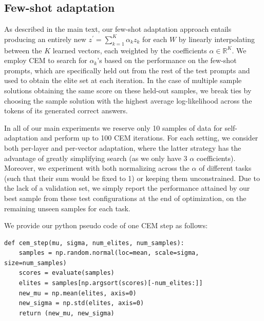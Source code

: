 

\subsection{Few-shot adaptation}
\label{app:sec:fewshot}

As described in the main text, our few-shot adaptation approach entails producing an entirely new $z^\prime=\sum^{K}_{k=1} \alpha_k z_k$ for each $W$ by linearly interpolating between the $K$ learned \svdacro vectors, each weighted by the coefficients $\alpha \in \mathbb{R}^K$.
We employ CEM to search for $\alpha_k$'s based on the performance on the few-shot prompts, which are specifically held out from the rest of the test prompts and used to obtain the elite set at each iteration. 
In the case of multiple sample solutions obtaining the same score on these held-out samples, we break ties by choosing the sample solution with the highest average log-likelihood across the tokens of its generated correct answers.

In all of our main experiments we reserve only 10 samples of data for self-adaptation and perform up to 100 CEM iterations. For each setting, we consider both per-layer and per-vector adaptation, where the latter strategy has the advantage of greatly simplifying search (as we only have 3 $\alpha$ coefficients). Moreover, we experiment with both normalizing across the $\alpha$ of different tasks (such that their sum would be fixed to 1) or keeping them unconstrained. Due to the lack of a validation set, we simply report the performance attained by our best sample from these test configurations at the end of optimization, on the remaining unseen samples for each task.

We provide our python pseudo code of one CEM step as follows:
\begin{verbatim}
def cem_step(mu, sigma, num_elites, num_samples):
    samples = np.random.normal(loc=mean, scale=sigma, size=num_samples)
    scores = evaluate(samples)
    elites = samples[np.argsort(scores)[-num_elites:]]
    new_mu = np.mean(elites, axis=0)
    new_sigma = np.std(elites, axis=0)
    return (new_mu, new_sigma)
\end{verbatim}
\vspace{-10mm}
